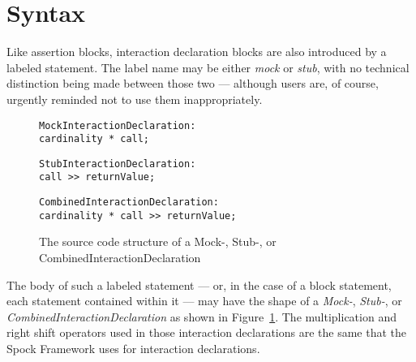 \section{Syntax}
Like assertion blocks, interaction declaration blocks are also introduced by a labeled statement.
The label name may be either \textit{mock} or \textit{stub},
with no technical distinction being made between those two ---
although users are, of course, urgently reminded not to use them inappropriately.

\begin{figure}
  {\color{teal}
    \begin{verbatim}
MockInteractionDeclaration:
cardinality * call;
    \end{verbatim}
  }
  {\color{magenta}
    \begin{verbatim}
StubInteractionDeclaration:
call >> returnValue;
    \end{verbatim}
  }
  {\color{violet}
    \begin{verbatim}
CombinedInteractionDeclaration:
cardinality * call >> returnValue;
    \end{verbatim}
  }
  \caption{
    The source code structure of a Mock-, Stub-, or CombinedInteractionDeclaration
  }\label{fig:InteractionBlockVariants}
\end{figure}

The body of such a labeled statement
--- or, in the case of a block statement, each statement contained within it ---
may have the shape of a \textit{Mock-}, \textit{Stub-}, or \textit{CombinedInteractionDeclaration}
as shown in Figure~\ref{fig:InteractionBlockVariants}.
The multiplication and right shift operators
used in those interaction declarations are the same
that the Spock Framework uses for interaction declarations.

